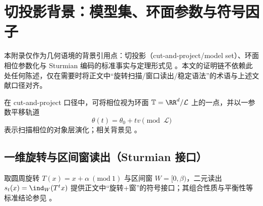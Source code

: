\section{切投影背景：模型集、环面参数与符号因子}\label{app:cut_project_background}

本附录仅作为几何语境的背景引用点：切投影（cut-and-project/model set）、环面相位参数化与 Sturmian 编码的标准事实与定理形式见 \cite{BaakeGrimmAperiodicOrder1,MeyerAlgebraicNumbers,QueffelecSubstitution,LindMarcus1995}。本文的证明链不依赖此处任何陈述，仅在需要时将正文中“旋转扫描/窗口读出/稳定语法”的术语与上述文献口径对齐。

\begin{remark}\label{rem:app-cutproject-phason-time}
在 cut-and-project 口径中，可将相位视为环面 \(\mathbb{T}=\RR^{d}/\mathcal{L}\) 上的一点，并以一参数平移轨道
\[
\theta(t)=\theta_0+t v\pmod{\mathcal{L}}
\]
表示扫描相位的对象层演化；相关背景见 \cite{BaakeGrimmAperiodicOrder1,MeyerAlgebraicNumbers}。
\end{remark}

\subsection{一维旋转与区间窗读出（Sturmian 接口）}
取圆周旋转 \(T(x)=x+\alpha\ (\mathrm{mod}\ 1)\) 与区间窗 \(W=[0,\beta)\)，二元读出 \(s_t(x)=\ind_W(T^t x)\) 提供正文中“旋转+\(\)窗”的符号接口；其组合性质与平衡性等标准结论参见 \cite{LindMarcus1995}。
